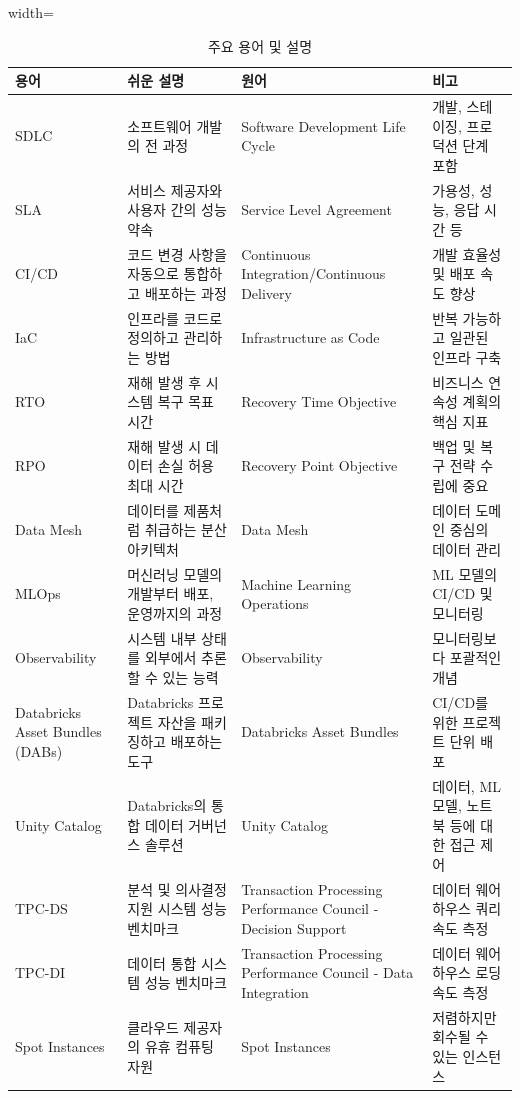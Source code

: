 \documentclass[11pt,a4paper]{article}
\theoremstyle{definition}
\begin{document}
\begin{table}[h!]
\centering
\caption{주요 용어 및 설명}
\label{tab:glossary}
\begin{adjustbox}{width=\textwidth}
\begin{tabular}{llll}
\toprule
\textbf{용어} & \textbf{쉬운 설명} & \textbf{원어} & \textbf{비고} \\
\midrule
SDLC & 소프트웨어 개발의 전 과정 & Software Development Life Cycle & 개발, 스테이징, 프로덕션 단계 포함 \\
SLA & 서비스 제공자와 사용자 간의 성능 약속 & Service Level Agreement & 가용성, 성능, 응답 시간 등 \\
CI/CD & 코드 변경 사항을 자동으로 통합하고 배포하는 과정 & Continuous Integration/Continuous Delivery & 개발 효율성 및 배포 속도 향상 \\
IaC & 인프라를 코드로 정의하고 관리하는 방법 & Infrastructure as Code & 반복 가능하고 일관된 인프라 구축 \\
RTO & 재해 발생 후 시스템 복구 목표 시간 & Recovery Time Objective & 비즈니스 연속성 계획의 핵심 지표 \\
RPO & 재해 발생 시 데이터 손실 허용 최대 시간 & Recovery Point Objective & 백업 및 복구 전략 수립에 중요 \\
Data Mesh & 데이터를 제품처럼 취급하는 분산 아키텍처 & Data Mesh & 데이터 도메인 중심의 데이터 관리 \\
MLOps & 머신러닝 모델의 개발부터 배포, 운영까지의 과정 & Machine Learning Operations & ML 모델의 CI/CD 및 모니터링 \\
Observability & 시스템 내부 상태를 외부에서 추론할 수 있는 능력 & Observability & 모니터링보다 포괄적인 개념 \\
Databricks Asset Bundles (DABs) & Databricks 프로젝트 자산을 패키징하고 배포하는 도구 & Databricks Asset Bundles & CI/CD를 위한 프로젝트 단위 배포 \\
Unity Catalog & Databricks의 통합 데이터 거버넌스 솔루션 & Unity Catalog & 데이터, ML 모델, 노트북 등에 대한 접근 제어 \\
TPC-DS & 분석 및 의사결정 지원 시스템 성능 벤치마크 & Transaction Processing Performance Council - Decision Support & 데이터 웨어하우스 쿼리 속도 측정 \\
TPC-DI & 데이터 통합 시스템 성능 벤치마크 & Transaction Processing Performance Council - Data Integration & 데이터 웨어하우스 로딩 속도 측정 \\
Spot Instances & 클라우드 제공자의 유휴 컴퓨팅 자원 & Spot Instances & 저렴하지만 회수될 수 있는 인스턴스 \\

\end{tabular}
\end{adjustbox}
\end{table}
\end{document}
